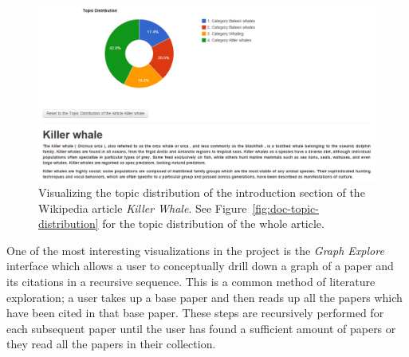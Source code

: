 \begin{figure}[htb]\centering 
\includegraphics[width=1\textwidth]{images/para_topic_distribution.png}
\caption{Visualizing the topic distribution of the introduction 
section of the Wikipedia article \textit{Killer Whale}. See Figure~\ref{fig:doc-topic-distribution} for the topic distribution of 
the whole article.}
\label{fig:doc-para-viz}
\end{figure}


One of the most interesting visualizations in the project is the 
\textsl{Graph Explore} interface which allows a user to conceptually 
drill down a graph of a paper and its citations in a recursive sequence.
This is a common method of literature exploration; a user takes up a base paper and then reads up all the papers which have been cited in that base paper.
These steps are recursively performed for each subsequent paper until the user has found a sufficient amount of papers or they read all the papers in their collection.

